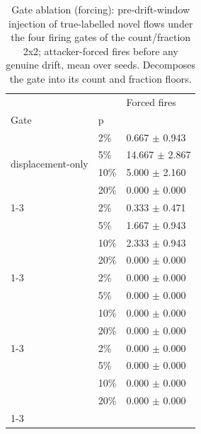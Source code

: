 \begin{table}
\caption{Gate ablation (forcing): pre-drift-window injection of true-labelled novel flows under the four firing gates of the count/fraction 2x2; attacker-forced fires before any genuine drift, mean over seeds. Decomposes the gate into its count and fraction floors.}
\label{tab:rq3-gate-forcing}
\begin{tabular}{lll}
\toprule
 &  & Forced fires \\
Gate & p &  \\
\midrule
\multirow[t]{4}{*}{displacement-only} & 2\% & 0.667 $\pm$ 0.943 \\
 & 5\% & 14.667 $\pm$ 2.867 \\
 & 10\% & 5.000 $\pm$ 2.160 \\
 & 20\% & 0.000 $\pm$ 0.000 \\
\cline{1-3}
\multirow[t]{4}{*}{count-only} & 2\% & 0.333 $\pm$ 0.471 \\
 & 5\% & 1.667 $\pm$ 0.943 \\
 & 10\% & 2.333 $\pm$ 0.943 \\
 & 20\% & 0.000 $\pm$ 0.000 \\
\cline{1-3}
\multirow[t]{4}{*}{fraction-only} & 2\% & 0.000 $\pm$ 0.000 \\
 & 5\% & 0.000 $\pm$ 0.000 \\
 & 10\% & 0.000 $\pm$ 0.000 \\
 & 20\% & 0.000 $\pm$ 0.000 \\
\cline{1-3}
\multirow[t]{4}{*}{full} & 2\% & 0.000 $\pm$ 0.000 \\
 & 5\% & 0.000 $\pm$ 0.000 \\
 & 10\% & 0.000 $\pm$ 0.000 \\
 & 20\% & 0.000 $\pm$ 0.000 \\
\cline{1-3}
\bottomrule
\end{tabular}
\end{table}

